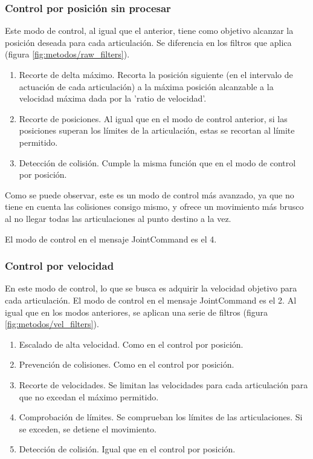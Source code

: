 \subsubsection{Control por posición sin procesar}
Este modo de control, al igual que el anterior, tiene como objetivo alcanzar la posición deseada para cada articulación. Se diferencia en los filtros que aplica (figura \ref{fig:metodos/raw_filters}).

\begin{enumerate}
\item {Recorte de delta máximo.} Recorta la posición siguiente (en el intervalo de actuación de cada articulación) a la máxima posición alcanzable a la velocidad máxima dada por la 'ratio de velocidad'.
\item {Recorte de posiciones.} Al igual que en el modo de control anterior, si las posiciones superan los límites de la articulación, estas se recortan al límite permitido.
\item {Detección de colisión.} Cumple la misma función que en el modo de control por posición.
\end{enumerate}

Como se puede observar, este es un modo de control más avanzado, ya que no tiene en cuenta las colisiones consigo mismo, y ofrece un movimiento más brusco al no llegar todas las articulaciones al punto destino a la vez.

El modo de control en el mensaje JointCommand es el 4.

\subsubsection{Control por velocidad}
En este modo de control, lo que se busca es adquirir la velocidad objetivo para cada articulación. El modo de control en el mensaje JointCommand es el 2. Al igual que en los modos anteriores, se aplican una serie de filtros (figura \ref{fig:metodos/vel_filters}).

\begin{enumerate}
\item {Escalado de alta velocidad.} Como en el control por posición.
\item {Prevención de colisiones.} Como en el control por posición.
\item {Recorte de velocidades.} Se limitan las velocidades para cada articulación para que no excedan el máximo permitido.
\item {Comprobación de límites.} Se comprueban los límites de las articulaciones. Si se exceden, se detiene el movimiento.
\item {Detección de colisión.} Igual que en el control por posición.
\end{enumerate}

